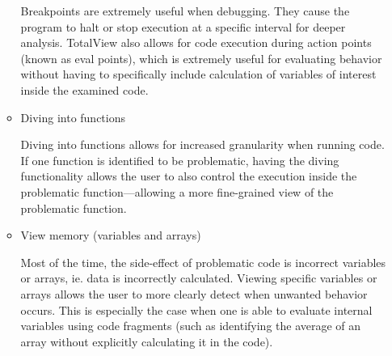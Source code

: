 \documentclass{article}
\begin{document}
\begin{enumerate}
\begin{itemize}
	Breakpoints are extremely useful when debugging. They cause the program to halt or stop execution at a specific interval for deeper analysis. TotalView also allows for code execution during action points (known as eval points), which is extremely useful for evaluating behavior without having to specifically include calculation of variables of interest inside the examined code. 
	\item Diving into functions
	
	Diving into functions allows for increased granularity when running code. If one function is identified to be problematic, having the diving functionality allows the user to also control the execution inside the problematic function---allowing a more fine-grained view of the problematic function.	
	\item View memory (variables and arrays)
	
	Most of the time, the side-effect of problematic code is incorrect variables or arrays, ie. data is incorrectly calculated. Viewing specific variables or arrays allows the user to more clearly detect when unwanted behavior occurs. This is especially the case when one is able to evaluate internal variables using code fragments (such as identifying the average of an array without explicitly calculating it in the code).

	\end{itemize}

\end{enumerate}


\end{document}
